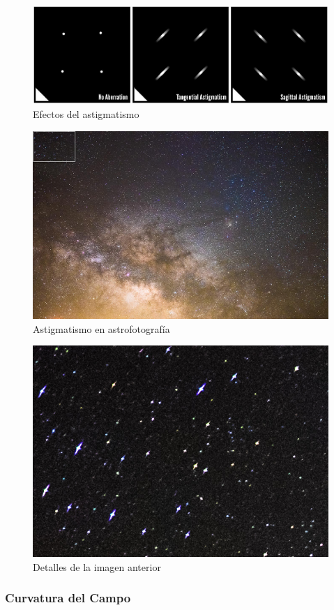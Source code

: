 \documentclass{article}
\begin{document}
\begin{figure}[H]
	\centering
	\includegraphics[width=0.85\linewidth]{Figuras/Astigmatismo_2}
	\caption{Efectos del astigmatismo}
	\label{fig:astigmatismo2}
\end{figure}

\begin{figure}[H]
	\centering
	\includegraphics[width=0.65\linewidth]{Figuras/Astigmatismo_3}
	\caption{Astigmatismo en astrofotografía}
	\label{fig:astigmatismo3}
\end{figure}

\begin{figure}[H]
	\centering
	\includegraphics[width=0.65\linewidth]{Figuras/Astigmatismo_4}
	\caption{Detalles de la imagen anterior}
	\label{fig:astigmatismo4}
\end{figure}

\subsubsection{Curvatura del Campo}
\end{document}
